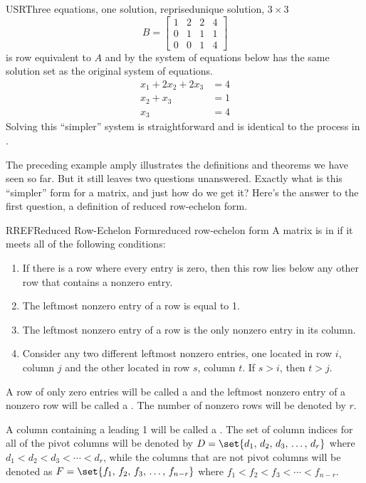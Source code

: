 \begin{example}{USR}{Three equations, one solution, reprised}{unique solution, $3\times 3$}
\begin{equation*}
B=\begin{bmatrix}
1&2&2&4\\
0&1& 1&1\\
0&0&1&4
\end{bmatrix}
\end{equation*}
is row equivalent to $A$
and by  the system of equations below has the same solution set as the original system of equations.
%
\begin{align*}
x_1+2x_2+2x_3&=4\\
x_2+ x_3&=1\\
x_3&=4
\end{align*}
Solving this ``simpler'' system is straightforward and is identical to the process in .
\end{example}
%
%
The preceding example amply illustrates the definitions and theorems we have seen so far.  But it still leaves two questions unanswered.  Exactly what is this ``simpler'' form for a matrix, and just how do we get it?  Here's the answer to the first question, a definition of reduced row-echelon form.
%
\begin{definition}{RREF}{Reduced Row-Echelon Form}{reduced row-echelon form}
A matrix is in  if it meets all of the following conditions:
\begin{enumerate}
\item If there is a row where every entry is zero, then this row lies below any other row that contains a nonzero entry.
\item The leftmost nonzero entry of a row is equal to 1.
\item The leftmost nonzero entry of a row is the only nonzero entry in its column.
\item Consider any two different leftmost nonzero entries, one located in row $i$, column $j$ and the other located in row $s$, column $t$.  If $s>i$, then $t>j$.
\end{enumerate}
A row of only zero entries will be called a  and the leftmost nonzero entry of a nonzero row will be called a .  The number of nonzero rows will be denoted by $r$.\par
%
A column containing a leading 1 will be called a .  The set of column indices for all of the pivot columns will be denoted by $D=\set{d_1,\,d_2,\,d_3,\,\ldots,\,d_r}$ where $d_1<d_2<d_3<\cdots<d_r$, while the columns that are not pivot columns will be denoted as $F=\set{f_1,\,f_2,\,f_3,\,\ldots,\,f_{n-r}}$ where $f_1<f_2<f_3<\cdots<f_{n-r}$.
\end{definition}
